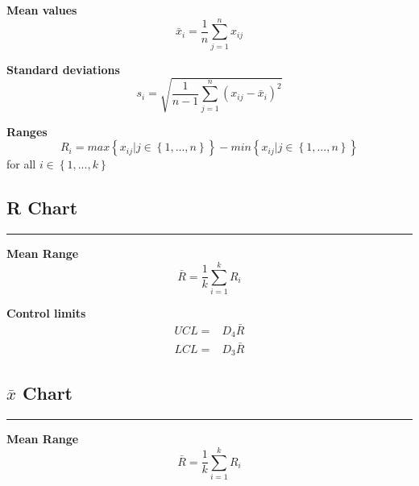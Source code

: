 \textbf{Mean values}
\begin{equation}
  \bar{x}_i = \frac{1}{n} \sum_{j=1}^n x_{ij}
\end{equation}

\textbf{Standard deviations}
\begin{equation}
  s_i = \sqrt{\frac{1}{n-1} \sum_{j=1}^n \left(x_{ij} - \bar{x}_i\right)^2}
\end{equation}

\textbf{Ranges}
\begin{equation}
  R_i = max\left \{x_{ij} | j \in \left \{1,...,n\right \} \right \} - min\left \{x_{ij} | j \in \left \{1,...,n\right \} \right \}
\end{equation}
for all $i \in \left \{1,...,k\right \}$

\subsection{R Chart}
\noindent\rule[\linienAbstand]{\linewidth}{\linienDicke}
\textbf{Mean Range}
\begin{equation}
  \bar{R} = \frac{1}{k} \sum^k_{i=1} R_i
\end{equation}

\textbf{Control limits}
\begin{equation}
  \begin{split}
    UCL =& D_4 \bar{R}\\
    LCL =& D_3 \bar{R}
  \end{split}
\end{equation}

\subsection{$\bar{x}$ Chart}
\noindent\rule[\linienAbstand]{\linewidth}{\linienDicke}
\textbf{Mean Range}
\begin{equation}
  \bar{R} = \frac{1}{k} \sum^k_{i=1} R_i
\end{equation}


